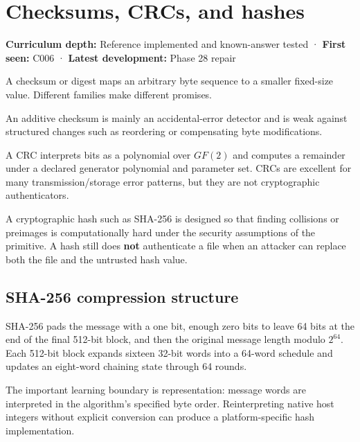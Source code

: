 \hypertarget{appendix-ed338677de0a}{}\label{referencestart:appendix-ed338677de0a}
\section{Checksums, CRCs, and hashes}\label{appendix-ed338677de0a-checksums-crcs-and-hashes}

\hypertarget{appendix-ed338677de0a-checksums-crcs-and-hashes}{}

\textbf{Curriculum depth:} Reference implemented and known-answer tested · \textbf{First seen:} C006 · \textbf{Latest development:} Phase 28 repair

A checksum or digest maps an arbitrary byte sequence to a smaller fixed-size value. Different families make different promises.

An additive checksum is mainly an accidental-error detector and is weak against structured changes such as reordering or compensating byte modifications.

A CRC interprets bits as a polynomial over \(GF(2)\) and computes a remainder under a declared generator polynomial and parameter set. CRCs are excellent for many transmission/storage error patterns, but they are not cryptographic authenticators.

A cryptographic hash such as SHA-256 is designed so that finding collisions or preimages is computationally hard under the security assumptions of the primitive. A hash still does \textbf{not} authenticate a file when an attacker can replace both the file and the untrusted hash value.

\subsection{SHA-256 compression structure}\label{appendix-ed338677de0a-sha-256-compression-structure}

\hypertarget{appendix-ed338677de0a-sha-256-compression-structure}{}

SHA-256 pads the message with a one bit, enough zero bits to leave 64 bits at the end of the final 512-bit block, and then the original message length modulo \(2^{64}\). Each 512-bit block expands sixteen 32-bit words into a 64-word schedule and updates an eight-word chaining state through 64 rounds.

The important learning boundary is representation: message words are interpreted in the algorithm's specified byte order. Reinterpreting native host integers without explicit conversion can produce a platform-specific hash implementation.

